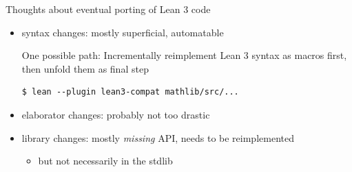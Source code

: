 \documentclass[t]{beamer}
\begin{document}
%
%
%
%
%
%
%
%
%
\begin{frame}[fragile]{Thoughts about eventual porting of Lean 3 code}
  \begin{itemize}
  \item syntax changes: mostly superficial, automatable
    \pause

    One possible path: Incrementally reimplement Lean 3 syntax as macros first, then unfold
    them as final step
\begin{verbatim}
$ lean --plugin lean3-compat mathlib/src/...
\end{verbatim}
    \pause
  \item elaborator changes: probably not too drastic
    \pause
  \item library changes: mostly \emph{missing} API, needs to be reimplemented
    \begin{itemize}
    \item but not necessarily in the stdlib
    \end{itemize}
  \end{itemize}
\end{frame}
\end{document}
